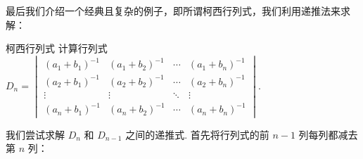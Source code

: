 最后我们介绍一个经典且复杂的例子，即所谓柯西行列式，我们利用递推法来求解：

\begin{example}{柯西行列式}{}
    计算行列式 $D_n=\begin{vmatrix}
            (a_1+b_1)^{-1} & (a_1+b_2)^{-1} & \cdots & (a_1+b_n)^{-1} \\
            (a_2+b_1)^{-1} & (a_2+b_2)^{-1} & \cdots & (a_2+b_n)^{-1} \\
            \vdots         & \vdots         & \ddots & \vdots         \\
            (a_n+b_1)^{-1} & (a_n+b_2)^{-1} & \cdots & (a_n+b_n)^{-1}
        \end{vmatrix}$.
\end{example}

\begin{solution}
    我们尝试求解 $D_n$ 和 $D_{n-1}$ 之间的递推式. 首先将行列式的前 $n-1$ 列每列都减去第 $n$ 列：


\end{solution}
